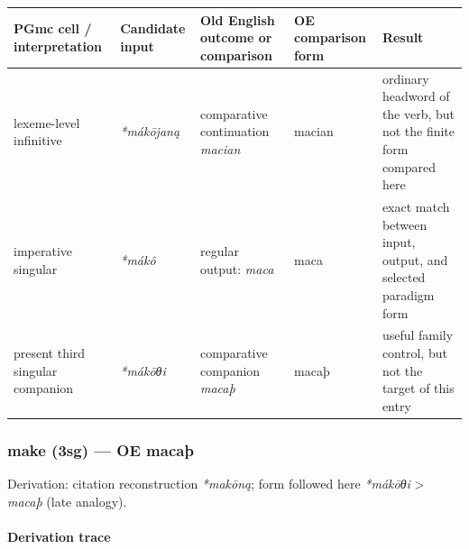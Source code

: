 \documentclass[
  british,
  a4paper,
]{article}
\newcounter{none} %
\begin{document}
{\def\LTcaptype{none} %
\begin{longtable}[]{@{}
  >{\raggedright\arraybackslash}p{}
  >{\raggedright\arraybackslash}p{}
  >{\raggedright\arraybackslash}p{}
  >{\raggedright\arraybackslash}p{}
  >{\raggedright\arraybackslash}p{}@{}}
\toprule\noalign{}
\begin{minipage}[b]{\linewidth}\raggedright
PGmc cell / interpretation
\end{minipage} & \begin{minipage}[b]{\linewidth}\raggedright
Candidate input
\end{minipage} & \begin{minipage}[b]{\linewidth}\raggedright
Old English outcome or comparison
\end{minipage} & \begin{minipage}[b]{\linewidth}\raggedright
OE comparison form
\end{minipage} & \begin{minipage}[b]{\linewidth}\raggedright
Result
\end{minipage} \\
\midrule\noalign{}
\endhead
\bottomrule\noalign{}
\endlastfoot
lexeme-level infinitive & \emph{*mákōjaną} & comparative continuation
\emph{macian} & macian & ordinary headword of the verb, but not the
finite form compared here \\
imperative singular & \emph{*mákô} & regular output: \emph{maca} & maca
& exact match between input, output, and selected paradigm form \\
present third singular companion & \emph{*mákōθi} & comparative
companion \emph{macaþ} & macaþ & useful family control, but not the
target of this entry \\
\end{longtable}
}

\subsubsection{make (3sg) --- OE macaþ}\label{make-3sg-oe-macauxfe}

Derivation: citation reconstruction \emph{*makōną}; form followed here
\emph{*mákōθi} \textgreater{} \emph{macaþ} (late analogy).

\paragraph{Derivation trace}\label{derivation-trace-58}
\end{document}

